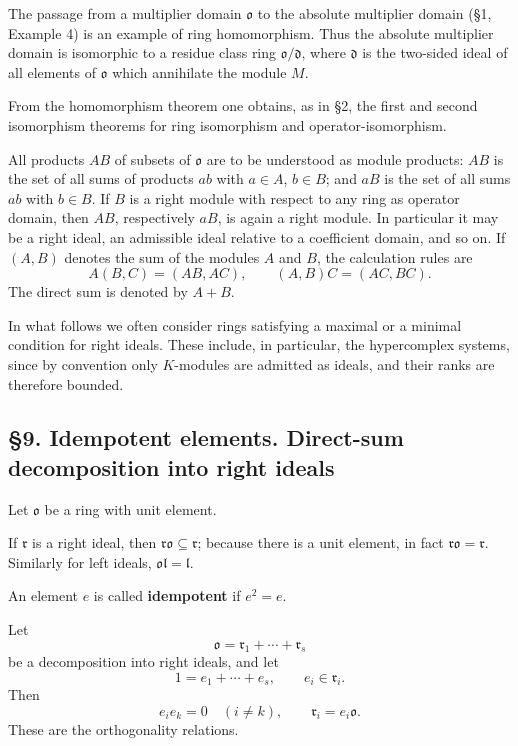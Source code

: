 \documentclass[
  11pt,
]{article}
\begin{document}
The passage from a multiplier domain \(\mathfrak{o}\) to the absolute
multiplier domain (§1, Example 4) is an example of ring homomorphism.
Thus the absolute multiplier domain is isomorphic to a residue class
ring \(\mathfrak{o}/\mathfrak d\), where \(\mathfrak d\) is the
two-sided ideal of all elements of \(\mathfrak{o}\) which annihilate the
module \(M\).

From the homomorphism theorem one obtains, as in §2, the first and
second isomorphism theorems for ring isomorphism and
operator-isomorphism.

All products \(AB\) of subsets of \(\mathfrak{o}\) are to be understood
as module products: \(AB\) is the set of all sums of products \(ab\)
with \(a\in A\), \(b\in B\); and \(aB\) is the set of all sums \(ab\)
with \(b\in B\). If \(B\) is a right module with respect to any ring as
operator domain, then \(AB\), respectively \(aB\), is again a right
module. In particular it may be a right ideal, an admissible ideal
relative to a coefficient domain, and so on. If \((A,B)\) denotes the
sum of the modules \(A\) and \(B\), the calculation rules are \[
  A(B,C)=(AB,AC),
  \qquad
  (A,B)C=(AC,BC).
\] The direct sum is denoted by \(A+B\).

In what follows we often consider rings satisfying a maximal or a
minimal condition for right ideals. These include, in particular, the
hypercomplex systems, since by convention only \(K\)-modules are
admitted as ideals, and their ranks are therefore bounded.

\subsection{§9. Idempotent elements. Direct-sum decomposition into right
ideals}\label{idempotent-elements.-direct-sum-decomposition-into-right-ideals}

Let \(\mathfrak{o}\) be a ring with unit element.

If \(\mathfrak r\) is a right ideal, then
\(\mathfrak r\mathfrak{o}\subseteq\mathfrak r\); because there is a unit
element, in fact \(\mathfrak r\mathfrak{o}=\mathfrak r\). Similarly for
left ideals, \(\mathfrak{o}\mathfrak l=\mathfrak l\).

An element \(e\) is called \textbf{idempotent} if \(e^2=e\).

Let \[
  \mathfrak{o}=\mathfrak r_1+\cdots+\mathfrak r_s
\] be a decomposition into right ideals, and let \[
  1=e_1+\cdots+e_s,
  \qquad e_i\in\mathfrak r_i.
\] Then \[
  e_i e_k=0\quad(i\ne k),
  \qquad
  \mathfrak r_i=e_i\mathfrak{o}.
\] These are the orthogonality relations.
\end{document}
